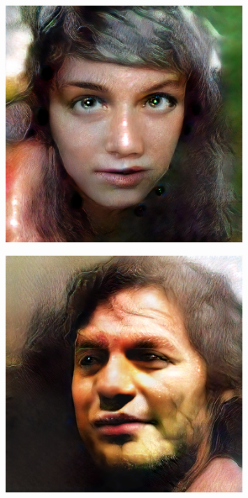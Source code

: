 \documentclass{beamer}
\begin{document}
\begin{frame}
\begin{figure}[h!]
	\centering
	\includegraphics[width=0.8\textwidth]{4k_woman.jpg}
\end{figure}
\end{frame}

\begin{frame}
\begin{figure}[h!]
	\centering
	\includegraphics[width=0.8\textwidth]{4k_man.jpg}
\end{figure}
\end{frame}
\end{document}
